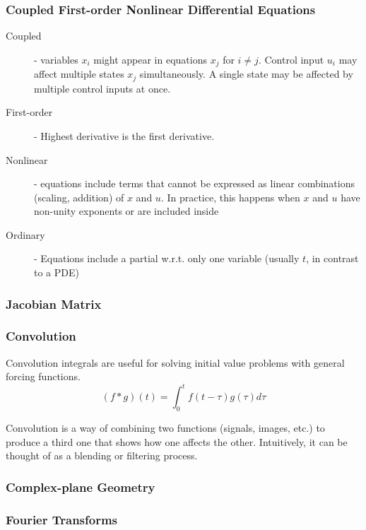 \documentclass[../notes.tex]{subfiles}
\begin{document}
\subsubsection{Coupled First-order Nonlinear Differential Equations} \label{sec:coupled_diff_eq}
\begin{description}
    \item[Coupled] - variables $x_i$ might appear in equations $x_j$ for $i \neq j$. Control input $u_i$ may affect multiple states $x_j$ simultaneously. A single state may be affected by multiple control inputs at once.
    \item[First-order] - Highest derivative is the first derivative.
    \item[Nonlinear] - equations include terms that cannot be expressed as linear combinations (scaling, addition) of $x$ and $u$. In practice, this happens when $x$ and $u$ have non-unity exponents or are included inside
    \item[Ordinary] - Equations include a partial w.r.t. only one variable (usually $t$, in contrast to a PDE)    
\end{description}

\subsubsection{Jacobian Matrix} \label{sec:jacobian}

\subsubsection{Convolution}
Convolution integrals are useful for solving initial value problems with general forcing functions.
\begin{equation}
    (f * g)(t) = \int_{0}^{t} f(t-\tau)g(\tau)d\tau
\end{equation}

Convolution is a way of combining two functions (signals, images, etc.) to produce a third one that shows how one affects the other. Intuitively, it can be thought of as a blending or filtering process.

\subsubsection{Complex-plane Geometry}

\subsubsection{Fourier Transforms}
\end{document}
